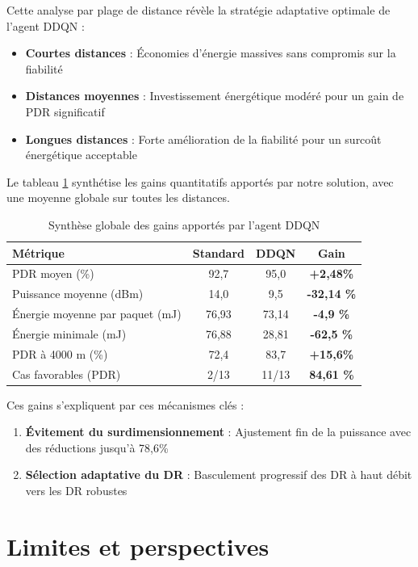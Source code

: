 Cette analyse par plage de distance révèle la stratégie adaptative optimale de l'agent DDQN :
\begin{itemize}
	\item \textbf{Courtes distances} : Économies d'énergie massives sans compromis sur la fiabilité
	\item \textbf{Distances moyennes} : Investissement énergétique modéré pour un gain de PDR significatif
	\item \textbf{Longues distances} : Forte amélioration de la fiabilité pour un surcoût énergétique acceptable
\end{itemize}

Le tableau \ref{tab:synthese-gains} synthétise les gains quantitatifs apportés par notre solution, avec une moyenne globale sur toutes les distances.

\begin{table}[H]
	\centering
	\caption{Synthèse globale des gains apportés par l'agent DDQN}
	\label{tab:synthese-gains}
	\begin{tabular}{|l|c|c|c|}
		\hline
		\textbf{Métrique} & \textbf{Standard} & \textbf{DDQN} & \textbf{Gain} \\
		\hline
		\hline
		PDR moyen (\%) & 92,7 & 95,0 & \textbf{+2,48\%} \\
		\hline
		Puissance moyenne (dBm) & 14,0 & 9,5 & \textbf{-32,14 \%} \\
		\hline
		Énergie moyenne par paquet (mJ) & 76,93 & 73,14 & \textbf{-4,9 \%} \\
		\hline
		Énergie minimale (mJ) & 76,88 & 28,81 & \textbf{-62,5 \%} \\
		\hline
		PDR à 4000 m (\%) & 72,4 & 83,7 & \textbf{+15,6\%} \\
		\hline
		Cas favorables (PDR) & 2/13 & 11/13 & \textbf{84,61 \%} \\
		\hline
	\end{tabular}
\end{table}

Ces gains s'expliquent par ces mécanismes clés :
\begin{enumerate}
	\item \textbf{Évitement du surdimensionnement} : Ajustement fin de la puissance avec des réductions jusqu'à 78,6\%
	\item \textbf{Sélection adaptative du DR} : Basculement progressif des DR à haut débit vers les DR robustes
\end{enumerate}

\section{Limites et perspectives}

